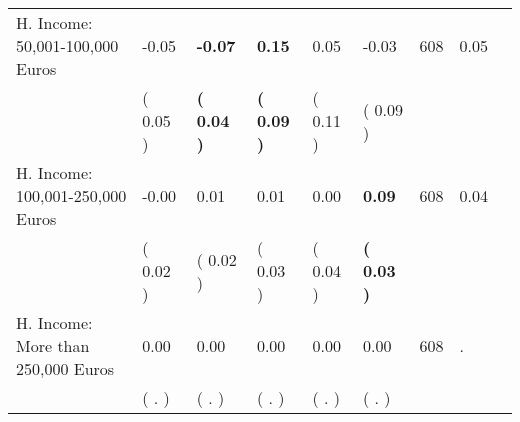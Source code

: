 \begin{tabular}{L{6.2cm} C{1.8cm} C{1.8cm} C{1.8cm} C{1.8cm} C{1.8cm} C{1.8cm} C{0.3cm} C{0.3cm}}
H. Income: 50,001-100,000 Euros &     -0.05 & \textbf{    -0.07} & \textbf{     0.15} &      0.05 &     -0.03  & 608 &       0.05 \\ 
 & (     0.05 ) & \textbf{(     0.04 )} & \textbf{(     0.09 )} & (     0.11 ) & (     0.09 )  & \\
H. Income: 100,001-250,000 Euros &     -0.00 &      0.01 &      0.01 &      0.00 & \textbf{     0.09}  & 608 &       0.04 \\ 
 & (     0.02 ) & (     0.02 ) & (     0.03 ) & (     0.04 ) & \textbf{(     0.03 )}  & \\
H. Income: More than 250,000 Euros &      0.00 &      0.00 &      0.00 &      0.00 &      0.00  & 608 &          . \\ 
 & (        . ) & (        . ) & (        . ) & (        . ) & (        . )  & \\
\bottomrule
\end{tabular}
